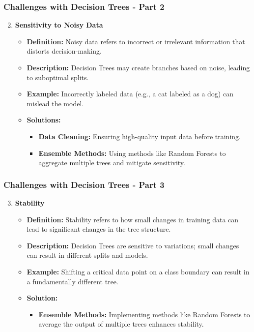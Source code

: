 \documentclass{beamer}
\begin{document}
\begin{frame}[fragile]
    \frametitle{Challenges with Decision Trees - Part 2}
    \begin{enumerate}
        \setcounter{enumi}{1}
        \item \textbf{Sensitivity to Noisy Data}
        \begin{itemize}
            \item \textbf{Definition:} Noisy data refers to incorrect or irrelevant information that distorts decision-making.
            \item \textbf{Description:} Decision Trees may create branches based on noise, leading to suboptimal splits.
            \item \textbf{Example:} Incorrectly labeled data (e.g., a cat labeled as a dog) can mislead the model.
            \item \textbf{Solutions:}
                \begin{itemize}
                    \item \textbf{Data Cleaning:} Ensuring high-quality input data before training.
                    \item \textbf{Ensemble Methods:} Using methods like Random Forests to aggregate multiple trees and mitigate sensitivity.
                \end{itemize}
        \end{itemize}
    \end{enumerate}
\end{frame}

\begin{frame}[fragile]
    \frametitle{Challenges with Decision Trees - Part 3}
    \begin{enumerate}
        \setcounter{enumi}{2}
        \item \textbf{Stability}
        \begin{itemize}
            \item \textbf{Definition:} Stability refers to how small changes in training data can lead to significant changes in the tree structure.
            \item \textbf{Description:} Decision Trees are sensitive to variations; small changes can result in different splits and models.
            \item \textbf{Example:} Shifting a critical data point on a class boundary can result in a fundamentally different tree.
            \item \textbf{Solution:}
                \begin{itemize}
                    \item \textbf{Ensemble Methods:} Implementing methods like Random Forests to average the output of multiple trees enhances stability.
                \end{itemize}
        \end{itemize}
    \end{enumerate}
\end{frame}
\end{document}

